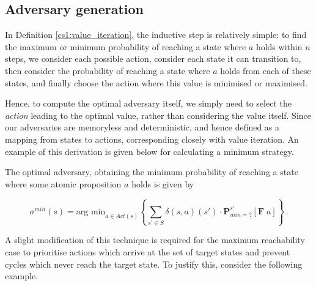 \subsection{Adversary generation}
\label{cs1:adversary_gen}

In Definition \ref{cs1:value_iteration}, the inductive step is relatively simple: to find the maximum or minimum probability of reaching a state where $a$ holds within $n$ steps, we consider each possible action, consider each state it can transition to, then consider the probability of reaching a state where $a$ holds from each of these states, and finally choose the action where this value is minimised or maximised.

Hence, to compute the optimal adversary itself, we simply need to select the \emph{action} leading to the optimal value, rather than considering the value itself. Since our adversaries are memoryless and deterministic, and hence defined as a mapping from states to actions, corresponding closely with value iteration. An example of this derivation is given below for calculating a minimum strategy.

\begin{definition}
\label{cs1:min_adv_generation}

The optimal adversary, obtaining the minimum probability of reaching a state where some atomic proposition $a$ holds is given by

\begin{equation*}
    \sigma^{min}(s) = \text{arg min}_{a \in Act(s)} \left\{ \sum_{s' \in S} \delta(s, a)(s') \cdot \mathbf{P}^{s'}_{min =?} [\mathbf{F} \; a]\right\} \, .
\end{equation*}

\end{definition}

A slight modification of this technique is required for the maximum reachability case to prioritise actions which arrive at the set of target states and prevent cycles which never reach the target state. To justify this, consider the following example.

